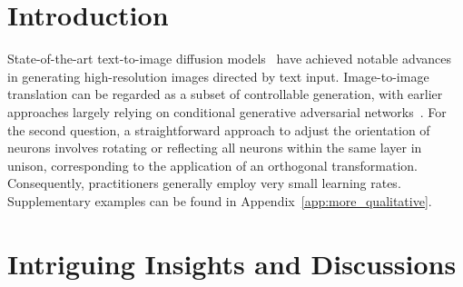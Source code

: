 \begin{itemize}[leftmargin=*,nosep]
\begin{abstract}
\textbf{Settings}. The phase spectrum encapsulates the angular relationship between the input and basis elements, and it is responsible for preserving most of the semantic content of an image. \textbf{Why OFT converges faster}. \end{abstract}

\section{Introduction}

State-of-the-art text-to-image diffusion models~\cite{saharia2022photorealistic,ramesh2022hierarchical,rombach2022high} have achieved notable advances in generating high-resolution images directed by text input. Image-to-image translation can be regarded as a subset of controllable generation, with earlier approaches largely relying on conditional generative adversarial networks~\cite{isola2017image,zhu2017toward,wang2018high,park2019semantic,choi2018stargan}. For the second question, a straightforward approach to adjust the orientation of neurons involves rotating or reflecting all neurons within the same layer in unison, corresponding to the application of an orthogonal transformation. Consequently, practitioners generally employ very small learning rates. Supplementary examples can be found in Appendix~\ref{app:more_qualitative}. \section{Intriguing Insights and Discussions}


\end{itemize}
